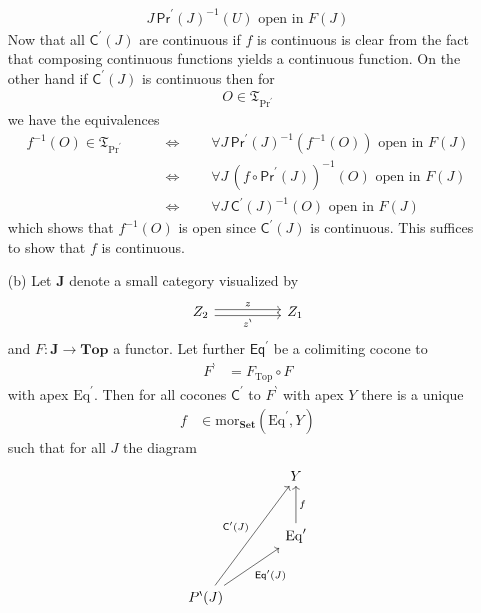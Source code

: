 \begin{prf}
\begin{enumerate}
\begin{align*}
  J
  \,
  \mathsf{Pr}^{\prime}(J)^{-1}
  (U)
  \text{ open in }
  F(J)
\end{align*}
Now that all $\mathsf{C}^{\prime}(J)$ are continuous if $f$ is continuous is clear from the fact that composing continuous functions yields a continuous function. On the other hand if $\mathsf{C}^{\prime}(J)$ is continuous then for
\begin{align*}
  O
  \in
  \mathfrak{T}_{\mathrm{Pr}^{\prime}}
\end{align*}
we have the equivalences
\begin{align*}
  f^{-1}(O)
  \in
  \mathfrak{T}_{\mathrm{Pr}^{\prime}}
  \qquad
  &\Leftrightarrow
  \qquad
  \forall
  J
  \,
  \mathsf{Pr}^{\prime}(J)^{-1}
  \left(
    f^{-1}(O)
  \right)
  \text{ open in }
  F(J)
  \\
  &\Leftrightarrow
  \qquad
  \forall
  J
  \,
  \left(
    f
    \circ
    \mathsf{Pr}^{\prime}(J)
  \right)^{-1}
  (O)
  \text{ open in }
  F(J)
  \\
  &\Leftrightarrow
  \qquad
  \forall
  J
  \,
  \mathsf{C}^{\prime}(J)^{-1}
  (O)
  \text{ open in }
  F(J)
\end{align*}
which shows that $f^{-1}(O)$ is open since $\mathsf{C}^{\prime}(J)$ is continuous. This suffices to show that $f$ is continuous.
\item[(b)]
Let $\mathbf{J}$ denote a small category visualized by
\[
\begin{tikzcd}[sep=huge]
  Z_{2}
  \arrow[shift left=0.5ex]{r}{z}
  \arrow[swap,shift right=0.5ex]{r}{z^{\backprime}}
  &
  Z_{1}
\end{tikzcd}
\]
and $F \colon \mathbf{J} \rightarrow \mathbf{Top}$ a functor. Let further $\mathsf{Eq}^{\prime}$ be a colimiting cocone to
\begin{align*}
  F^{\backprime}
  &=
  F_{\mathrm{Top}}
  \circ
  F
\end{align*}
with apex $\mathrm{Eq}^{\prime}$. Then for all cocones $\mathsf{C}^{\prime}$ to $F^{\backprime}$ with apex $Y$ there is a unique
\begin{align*}
  f
  &\in
  \mathrm{mor}_{\mathbf{Set}}
  \left(
    \mathrm{Eq}^{\prime},
    Y
  \right)
\end{align*}
such that for all $J$ the diagram
\[
\begin{tikzcd}[sep=large]
  &
  Y
  \\
  &
  \mathrm{Eq}^{\prime}
  \arrow[swap]{u}{f}
  \\
  P^{\backprime}(J)
  \arrow{uur}{\mathsf{C}^{\prime}(J)}
  \arrow[swap]{ur}{\mathsf{Eq}^{\prime}(J)}

\end{tikzcd}\]
\end{enumerate}
\end{prf}
